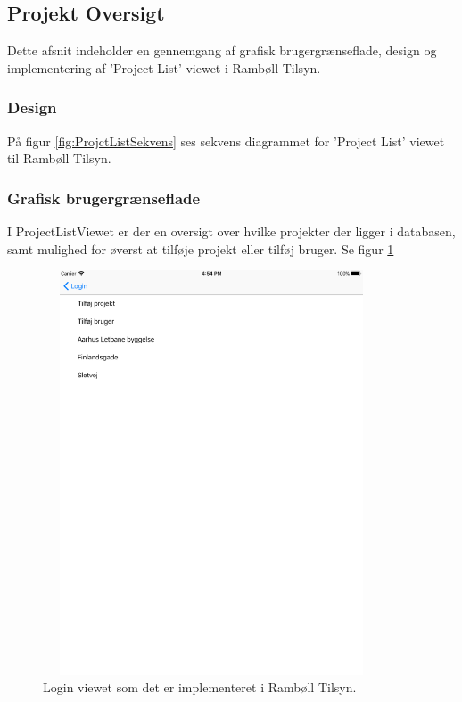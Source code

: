 \subsection{Projekt Oversigt} \label{sec:ProjectList}
Dette afsnit indeholder en gennemgang af grafisk brugergrænseflade, design og implementering af 'Project List' viewet i Rambøll Tilsyn.

\subsubsection{Design}
På figur \ref{fig:ProjctListSekvens} ses sekvens diagrammet for 'Project List' viewet til Rambøll Tilsyn.

\clearpage

\subsubsection{Grafisk brugergrænseflade}
I ProjectListViewet er der en oversigt over hvilke projekter der ligger i databasen, samt mulighed for øverst at tilføje projekt eller tilføj bruger. Se figur \ref{fig:ProjectListView}
\begin{figure}[H] %
	\centering
	\includegraphics[height=12cm, width=10cm]{../ArkitekturDesign/Design/ProjectList/ProjectList}
	\caption{Login viewet som det er implementeret i Rambøll Tilsyn.}
	\label{fig:ProjectListView}
\end{figure}


